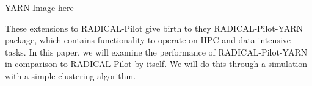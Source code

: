 \documentclass[]{article}
\begin{document}
	YARN Image here

	These extensions to RADICAL-Pilot give birth to they RADICAL-Pilot-YARN package, which contains functionality to operate on HPC and data-intensive tasks. In this paper, we will examine the performance of RADICAL-Pilot-YARN in comparison to RADICAL-Pilot by itself. We will do this through a simulation with a simple clustering algorithm.






\end{document}
